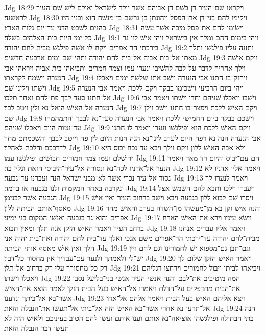 Jdg 18:29  ויקראו שׁם־העיר דן בשׁם דן אביהם אשׁר יולד לישׂראל ואולם לישׁ שׁם־העיר לראשׁנה׃
Jdg 18:30  ויקימו להם בני־דן את־הפסל ויהונתן בן־גרשׁם בן־מנשׁה הוא ובניו היו כהנים לשׁבט הדני עד־יום גלות הארץ׃
Jdg 18:31  וישׂימו להם את־פסל מיכה אשׁר עשׂה כל־ימי היות בית־האלהים בשׁלה׃
Jdg 19:1  ויהי בימים ההם ומלך אין בישׂראל ויהי אישׁ לוי גר בירכתי הר־אפרים ויקח־לו אשׁה פילגשׁ מבית לחם יהודה׃
Jdg 19:2  ותזנה עליו פילגשׁו ותלך מאתו אל־בית אביה אל־בית לחם יהודה ותהי־שׁם ימים ארבעה חדשׁים׃
Jdg 19:3  ויקם אישׁה וילך אחריה לדבר על־לבה להשׁיבו ונערו עמו וצמד חמרים ותביאהו בית אביה ויראהו אבי הנערה וישׂמח לקראתו׃
Jdg 19:4  ויחזק־בו חתנו אבי הנערה וישׁב אתו שׁלשׁת ימים ויאכלו וישׁתו וילינו שׁם׃
Jdg 19:5  ויהי ביום הרביעי וישׁכימו בבקר ויקם ללכת ויאמר אבי הנערה אל־חתנו סעד לבך פת־לחם ואחר תלכו׃
Jdg 19:6  וישׁבו ויאכלו שׁניהם יחדו וישׁתו ויאמר אבי הנערה אל־האישׁ הואל־נא ולין ויטב לבך׃
Jdg 19:7  ויקם האישׁ ללכת ויפצר־בו חתנו וישׁב וילן שׁם׃
Jdg 19:8  וישׁכם בבקר ביום החמישׁי ללכת ויאמר אבי הנערה סעד־נא לבבך והתמהמהו עד־נטות היום ויאכלו שׁניהם׃
Jdg 19:9  ויקם האישׁ ללכת הוא ופילגשׁו ונערו ויאמר לו חתנו אבי הנערה הנה נא רפה היום לערב לינו־נא הנה חנות היום לין פה וייטב לבבך והשׁכמתם מחר לדרככם והלכת לאהלך׃
Jdg 19:10  ולא־אבה האישׁ ללון ויקם וילך ויבא עד־נכח יבוס היא ירושׁלם ועמו צמד חמורים חבושׁים ופילגשׁו עמו׃
Jdg 19:11  הם עם־יבוס והיום רד מאד ויאמר הנער אל־אדניו לכה־נא ונסורה אל־עיר־היבוסי הזאת ונלין בה׃
Jdg 19:12  ויאמר אליו אדניו לא נסור אל־עיר נכרי אשׁר לא־מבני ישׂראל הנה ועברנו עד־גבעה׃
Jdg 19:13  ויאמר לנערו לך ונקרבה באחד המקמות ולנו בגבעה או ברמה׃
Jdg 19:14  ויעברו וילכו ותבא להם השׁמשׁ אצל הגבעה אשׁר לבנימן׃
Jdg 19:15  ויסרו שׁם לבוא ללון בגבעה ויבא וישׁב ברחוב העיר ואין אישׁ מאסף־אותם הביתה ללון׃
Jdg 19:16  והנה אישׁ זקן בא מן־מעשׂהו מן־השׂדה בערב והאישׁ מהר אפרים והוא־גר בגבעה ואנשׁי המקום בני ימיני׃
Jdg 19:17  וישׂא עיניו וירא את־האישׁ הארח ברחב העיר ויאמר האישׁ הזקן אנה תלך ומאין תבוא׃
Jdg 19:18  ויאמר אליו עברים אנחנו מבית־לחם יהודה עד־ירכתי הר־אפרים משׁם אנכי ואלך עד־בית לחם יהודה ואת־בית יהוה אני הלך ואין אישׁ מאסף אותי הביתה׃
Jdg 19:19  וגם־תבן גם־מספוא ישׁ לחמורינו וגם לחם ויין ישׁ־לי ולאמתך ולנער עם־עבדיך אין מחסור כל־דבר׃
Jdg 19:20  ויאמר האישׁ הזקן שׁלום לך רק כל־מחסורך עלי רק ברחוב אל־תלן׃
Jdg 19:21  ויביאהו לביתו ויבול לחמורים וירחצו רגליהם ויאכלו וישׁתו׃
Jdg 19:22  המה מיטיבים את־לבם והנה אנשׁי העיר אנשׁי בני־בליעל נסבו את־הבית מתדפקים על־הדלת ויאמרו אל־האישׁ בעל הבית הזקן לאמר הוצא את־האישׁ אשׁר־בא אל־ביתך ונדענו׃
Jdg 19:23  ויצא אליהם האישׁ בעל הבית ויאמר אלהם אל־אחי אל־תרעו נא אחרי אשׁר־בא האישׁ הזה אל־ביתי אל־תעשׂו את־הנבלה הזאת׃
Jdg 19:24  הנה בתי הבתולה ופילגשׁהו אוציאה־נא אותם וענו אותם ועשׂו להם הטוב בעיניכם ולאישׁ הזה לא תעשׂו דבר הנבלה הזאת׃

